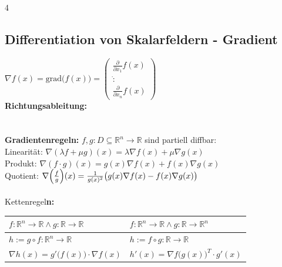 \documentclass[6pt,a4paper]{scrartcl}
\let\olddot = \dot
\newcommand{\norm}[1]{\ensuremath{\|#1\|}}                                                      %
\newcommand{\svdots}{\ensuremath{\olddot :}}                                                    %
\renewcommand{\vec}[1]{\ensuremath{\boldsymbol {#1}}}                                           %
\renewcommand{\emph}[1]{\textbf{#1}}                                                            %
\renewcommand*{\dot}[1]{\accentset{\mbox{\textrm{\large\bfseries .}} }{#1}}                     %
\begin{document}
\begin{multicols*}{4}
    \subsection{Differentiation von Skalarfeldern - Gradient}
    $\nabla f(x) = \mathrm{grad} \bigl( f(x) \bigr) = \begin{pmatrix}  \frac{\partial}{\partial x_1} f(x) \\ \svdots \\ \frac{\partial}{\partial x_n} f(x) \end{pmatrix}$\\
    \emph{Richtungsableitung:} \boxed { \partial_{\vec v} f(x) = \left\langle \nabla f(x), \vec v \right\rangle } \quad \boxed{ \norm{\vec v}=1 }\\
    \\
    \\
    \textbf{Gradientenregeln:} $f,g:D \subseteq \mathbb R^n \rightarrow \mathbb R$ sind partiell diffbar:\\
    Linearität: $\nabla(\lambda f + \mu g) (x) = \lambda \nabla f(x) + \mu \nabla g(x)$\\
    Produkt: $\nabla (f \cdot g) (x) = g(x) \nabla f(x) + f(x) \nabla g(x)$\\
    Quotient: $\nabla \Bigl( \frac{f}{g} \Bigr)(x) = \frac{1}{g(x)^2} \bigl( g(x)\nabla f(x) - f(x) \nabla g(x) \bigr)$\\
    \\
    Kettenregel\textbf{n:}\\
    \begin{tabular}{l|l}
        $f:\mathbb R^n \rightarrow \mathbb R \land g:\mathbb R \rightarrow \mathbb R$ & $f:\mathbb R^n \rightarrow \mathbb R \land g:\mathbb R \rightarrow \mathbb R^n$ \\ \midrule
        $h:= g \circ f: \mathbb R^n \rightarrow \mathbb R$                            & $h:= f \circ g: \mathbb R \rightarrow \mathbb R$                                \\
        $\boxed{ \nabla h(x) = g'\big( f(x) \big) \cdot \nabla f(x)}$                 & $\boxed{h'(x)=\nabla f\big( g(x) \big)^T \cdot g'(x)}$
    \end{tabular}



\end{multicols*}
\end{document}
